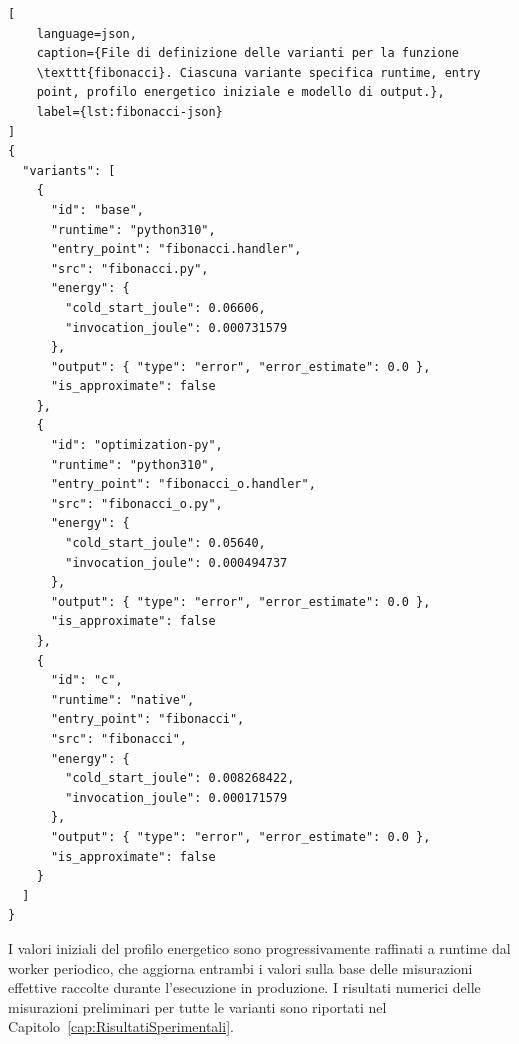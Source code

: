\begin{lstlisting}[
    language=json,
    caption={File di definizione delle varianti per la funzione 
    \texttt{fibonacci}. Ciascuna variante specifica runtime, entry 
    point, profilo energetico iniziale e modello di output.},
    label={lst:fibonacci-json}
]
{
  "variants": [
    {
      "id": "base",
      "runtime": "python310",
      "entry_point": "fibonacci.handler",
      "src": "fibonacci.py",
      "energy": {
        "cold_start_joule": 0.06606,
        "invocation_joule": 0.000731579
      },
      "output": { "type": "error", "error_estimate": 0.0 },
      "is_approximate": false
    },
    {
      "id": "optimization-py",
      "runtime": "python310",
      "entry_point": "fibonacci_o.handler",
      "src": "fibonacci_o.py",
      "energy": {
        "cold_start_joule": 0.05640,
        "invocation_joule": 0.000494737
      },
      "output": { "type": "error", "error_estimate": 0.0 },
      "is_approximate": false
    },
    {
      "id": "c",
      "runtime": "native",
      "entry_point": "fibonacci",
      "src": "fibonacci",
      "energy": {
        "cold_start_joule": 0.008268422,
        "invocation_joule": 0.000171579
      },
      "output": { "type": "error", "error_estimate": 0.0 },
      "is_approximate": false
    }
  ]
}
\end{lstlisting}

I valori iniziali del profilo energetico sono progressivamente 
raffinati a runtime dal worker periodico, che aggiorna entrambi i valori sulla base delle misurazioni effettive 
raccolte durante l'esecuzione in produzione. I risultati numerici 
delle misurazioni preliminari per tutte le varianti sono riportati 
nel Capitolo~\ref{cap:RisultatiSperimentali}.